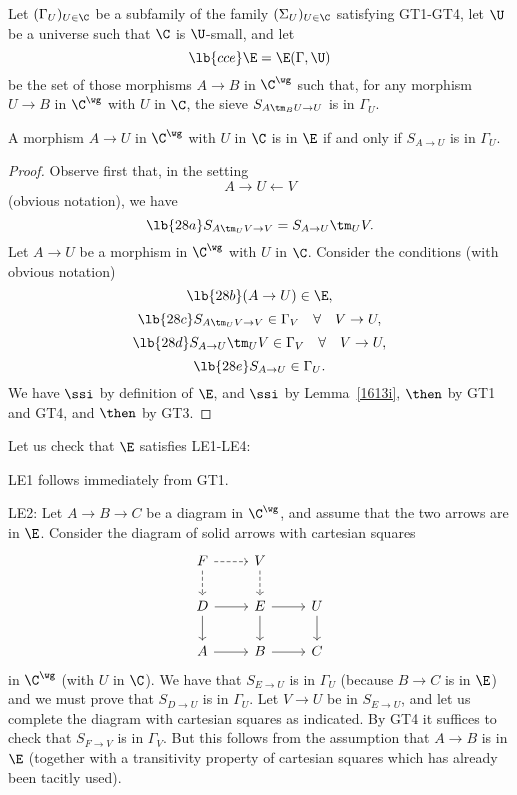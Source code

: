 \documentclass[12pt]{article}
\theoremstyle{remark}
\theoremstyle{definition}
\begin{document}
Let $(\Gamma_U)_{U\in\C}$ be a subfamily of the family $(\Sigma_U)_{U\in\C}$ satisfying GT1\--GT4, let $\U$ be a universe such that $\C$ is $\U$-small, and let 
%
\begin{equation}\lb{cce}
\E=\E(\Gamma,\U)
\end{equation}
%
be the set of those morphisms $A\to B$ in $\C^\wg$ such that, for any morphism $U\to B$ in $\C^\wg$ with $U$ in $\C$, the sieve $S_{A\tm_BU\to U}$ is in $\Gamma_U$. 

\begin{lem}
A morphism $A\to U$ in $\C^\wg$ with $U$ in $\C$ is in $\E$ if and only if $S_{A\to U}$ is in $\Gamma_U$. 
\end{lem}

\begin{proof}
Observe first that, in the setting 
$$
A\to U\leftarrow V
$$ 
(obvious notation), we have 
\begin{equation}\lb{28a}
S_{A\tm_UV\to V}=S_{A\to U}\tm_UV.
\end{equation} 
Let $A\to U$ be a morphism in $\C^\wg$ with $U$ in $\C$. Consider the conditions (with obvious notation) 
\begin{equation}\lb{28b}
(A\to U)\in\E,
\end{equation}
\begin{equation}\lb{28c}
S_{A\tm_UV\to V}\in\Gamma_V\quad\forall\quad V\to U,
\end{equation}
\begin{equation}\lb{28d}
S_{A\to U}\tm_UV\in\Gamma_V\quad\forall\quad V\to U,
\end{equation}
\begin{equation}\lb{28e}
S_{A\to U}\in\Gamma_U.
\end{equation} 
We have  $\ssi$  by definition of $\E$, and  $\ssi$  by Lemma~\ref{1613i},  $\then$  by GT1 and GT4, and  $\then$  by GT3.
\end{proof}

Let us check that $\E$ satisfies LE1-LE4:

\nn LE1 follows immediately from GT1.

\nn LE2: Let $A\to B\to C$ be a diagram in $\C^\wg$, and assume that the two arrows are in $\E$. Consider the diagram of solid arrows with cartesian squares 
$$
\begin{tikzcd}
F\ar[dashed]{r}\ar[dashed]{d}&V\ar[dashed]{d}\\ 
D\ar{r}\ar{d}&E\ar{r}\ar{d}&U\ar{d}\\ 
A\ar{r}&B\ar{r}&C
\end{tikzcd}
$$
in $\C^\wg$ (with $U$ in $\C$). We have that $S_{E\to U}$ is in $\Gamma_U$ (because $B\to C$ is in $\E$) and we must prove that $S_{D\to U}$ is in $\Gamma_U$. Let $V\to U$ be in $S_{E\to U}$, and let us complete the diagram with cartesian squares as indicated. By GT4 it suffices to check that $S_{F\to V}$ is in $\Gamma_V$. But this follows from the assumption that $A\to B$ is in $\E$ (together with a transitivity property of cartesian squares which has already been tacitly used).
\end{document}
